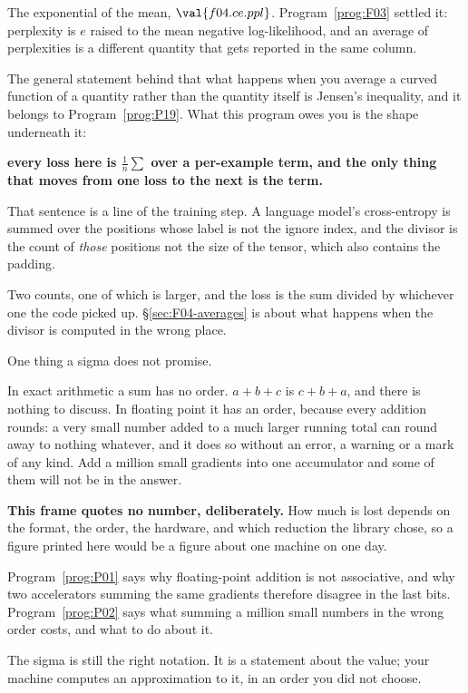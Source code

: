 \begin{fr}
\begin{ansblock}
The exponential of the mean, $\val{f04.ce.ppl}$. Program~\ref{prog:F03}
settled it: perplexity is $e$ raised to the mean negative log-likelihood, and
an average of perplexities is a different quantity that gets reported in the
same column.
\end{ansblock}

The general statement behind that \dash{} what happens when you average a
curved function of a quantity rather than the quantity itself \dash{} is
Jensen's inequality, and it belongs to Program~\ref{prog:P19}. What this
program owes you is the shape underneath it:

\textbf{every loss here is $\frac{1}{n}\sum$ over a per-example term, and the
only thing that moves from one loss to the next is the term.}

\begin{aibox}
That sentence is a line of the training step. A language model's
cross-entropy is summed over the positions whose label is not the ignore
index, and the divisor is the count of \emph{those} positions \dash{} not the
size of the tensor, which also contains the padding.

Two counts, one of which is larger, and the loss is the sum divided by
whichever one the code picked up. \S\ref{sec:F04-averages} is about what
happens when the divisor is computed in the wrong place.
\end{aibox}
\end{fr}

\begin{fr}
One thing a sigma does not promise.

In exact arithmetic a sum has no order. $a + b + c$ is $c + b + a$, and there
is nothing to discuss. In floating point it has an order, because every
addition rounds: a very small number added to a much larger running total can
round away to nothing whatever, and it does so without an error, a warning or
a mark of any kind. Add a million small gradients into one accumulator and
some of them will not be in the answer.

\begin{warning}
\textbf{This frame quotes no number, deliberately.} How much is lost depends
on the format, the order, the hardware, and which reduction the library chose,
so a figure printed here would be a figure about one machine on one day.

Program~\ref{prog:P01} says why floating-point addition is not associative, and
why two accelerators summing the same gradients therefore disagree in the last
bits.
Program~\ref{prog:P02} says what summing a million small numbers in the wrong
order costs, and what to do about it.

The sigma is still the right notation. It is a statement about the value; your
machine computes an approximation to it, in an order you did not choose.
\end{warning}
\end{fr}

